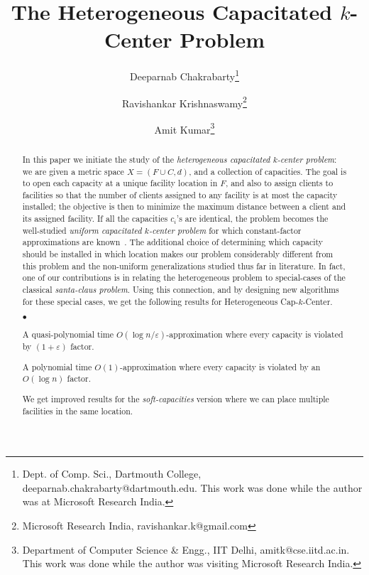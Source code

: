 \documentclass{llncs}
\def\mckc{{{\sffamily Heterogeneous Cap-$k$-Center}}\xspace}
\renewcommand{\epsilon}{\varepsilon}
\newcommand{\initOneLiners}{%
    \setlength{\itemsep}{0pt}
    \setlength{\parsep }{0pt}
    \setlength{\topsep }{0pt}
%
}
\newenvironment{oneLiners}[1][\ensuremath{\bullet}]
    {\begin{list}
        {#1}
        {\initOneLiners}}
    {\end{list}}
\begin{document}
\title{The Heterogeneous Capacitated $k$-Center Problem}
\date{}
\author{Deeparnab Chakrabarty\thanks{Dept. of Comp. Sci., Dartmouth College, deeparnab.chakrabarty@dartmouth.edu. This work was done while the author was at Microsoft Research India.} \and Ravishankar Krishnaswamy\thanks{Microsoft Research India, ravishankar.k@gmail.com} \and Amit Kumar\thanks{Department of Computer Science \& Engg., IIT Delhi, amitk@cse.iitd.ac.in. This work was done while the author was visiting Microsoft Research India. }}
\institute{}
\maketitle
\begin{abstract}
	In this paper we initiate the study of the {\em heterogeneous capacitated $k$-center problem}: we are given a metric space $X = (F \cup C, d)$, and a collection of capacities. The goal is to open each capacity at a unique facility location in $F$, and also to assign clients to facilities so that the number of clients assigned to any facility is at most the capacity installed; the objective is then to minimize the maximum distance between a client and its assigned facility. If all the capacities $c_i$'s are identical, the problem becomes the well-studied {\em uniform capacitated $k$-center problem} for which constant-factor approximations are known~\cite{Bar-IlanKP93,KhullerS00}.
The additional choice of determining which capacity should be installed in which location makes our problem considerably different from this problem and the non-uniform generalizations studied thus far in literature. In fact, one of our contributions is in relating the heterogeneous problem to special-cases of the classical {\em santa-claus problem}. Using this connection, and by designing new algorithms for these special cases, we get the following results for \mckc.
\begin{oneLiners}
\item A quasi-polynomial time $O(\log n/\epsilon)$-approximation where every capacity is violated by $(1+\epsilon)$ factor.
\item A polynomial time $O(1)$-approximation where every capacity is violated by an $O(\log n)$ factor.
\end{oneLiners}
We get improved results for the {\em soft-capacities} version where we can place multiple facilities in the same location.
\end{abstract}


\end{document}
